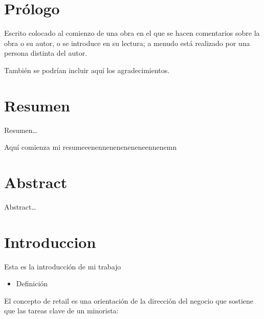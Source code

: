 \documentclass[12pt,a4paper,]{book}
\def\ifdoblecara{} %
\providecommand{\tightlist}{%
  \setlength{\itemsep}{0pt}\setlength{\parskip}{0pt}}
\numberwithin{dummy}{section}
\theoremstyle{ocrenumbox}
\theoremstyle{blacknumex}
\theoremstyle{blacknumbox}
\theoremstyle{ocrenum}
\theoremstyle{ocrenum}
\begin{document}
\raggedbottom




\setlength{\parindent}{1em}

\pagestyle{fancy}
\ifdefined\ifdoblecara
\fancyhead[LE,RO]{}
\fancyhead[LO,RE]{}
\else
\fancyhead[RO]{}
\fancyhead[LO]{}
\fi
\renewcommand{\headrulewidth}{0pt}
\renewcommand{\footrulewidth}{0pt}

\setcounter{tocdepth}{4}
\tableofcontents

\cleardoublepage

\section*{Prólogo}

Escrito colocado al comienzo de una obra en el que se hacen comentarios
sobre la obra o su autor, o se introduce en su lectura; a menudo está
realizado por una persona distinta del autor.

También se podrían incluir aquí los agradecimientos.

\cleardoublepage

\section*{Resumen}

Resumen\ldots{}

Aquí comienza mi resumeeenenneneneneneneennenemn

\clearpage
\section*{Abstract}

Abstract\ldots{}

\clearpage
\section*{Introduccion}

Esta es la introducción de mi trabajo

\begin{itemize}
\tightlist
\item
  Definición
\end{itemize}

El concepto de retail es una orientación de la dirección del negocio que
sostiene que las tareas clave de un minorista:
\end{document}
